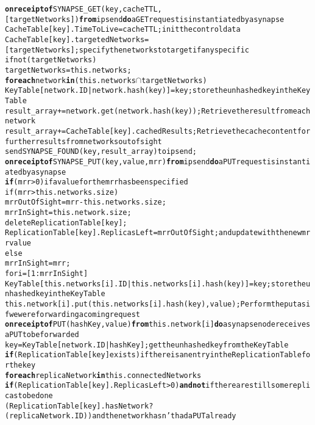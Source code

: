 \begin{figure*}[!t]
{\scriptsize
\begin{alltt}
\AL\textbf{on receipt of} SYNAPSE_GET(key, cacheTTL, [targetNetworks]) \textbf{from} ipsend \textbf{do}\hfill{\rm a GET request is instantiated by a synapse}
\AL CacheTable[key].TimeToLive = cacheTTL; \hfill{\rm init the control data}
\AL CacheTable[key].targetedNetworks = [targetNetworks]; \hfill{\rm specify the networks to target if any specific}  
\AL if not (targetNetworks) \hfill{}
\AL  targetNetworks = this.networks; \hfill{}
\AL \textbf{for each} network \textbf{in} (this.networks \(\cap\) targetNetworks) \hfill{}
\AL  KeyTable[network.ID|network.hash(key)] = key; \hfill{\rm store the unhashed key in the KeyTable}  
\AL  result_array += network.get(network.hash(key)); \hfill{\rm Retrieve the result from each network}
\AL result_array += CacheTable[key].cachedResults; \hfill{\rm Retrieve the cache content for further results from networks out of sight}
\AL send SYNAPSE_FOUND(key, result_array) to ipsend;
\NA
\AL\textbf{on receipt of} SYNAPSE_PUT(key, value, mrr) \textbf{from} ipsend \textbf{do}\hfill{\rm a PUT request is instantiated by a synapse}
\AL \textbf{if} (mrr > 0)  \hfill{\rm if a value for the mrr has been specified}
\AL  if (mrr > this.networks.size)
\AL   mrrOutOfSight = mrr - this.networks.size;
\AL   mrrInSight = this.network.size;
\AL   delete ReplicationTable[key];
\AL   ReplicationTable[key].ReplicasLeft = mrrOutOfSight; \hfill{\rm and update with the new mrr value}
\AL  else
\AL   mrrInSight = mrr;
\AL  for i = [1:mrrInSight]
\AL   KeyTable[this.networks[i].ID|this.networks[i].hash(key)] = key; \hfill{\rm store the unhashed key in the KeyTable}
\AL   this.network[i].put(this.networks[i].hash(key), value);\hfill{\rm Perform the put as if we were forwarding a coming request}
\NA
\AL\textbf{on receipt of} PUT(hashKey, value) \textbf{from} this.network[i] \textbf{do}\hfill{\rm a synapse node receives a PUT to be forwarded}
\AL key = KeyTable[network.ID|hashKey]; \hfill{\rm get the unhashed key from the Key Table}
\AL \textbf{if} (ReplicationTable[key] exists) \hfill{\rm if there is an entry in the Replication Table for the key}
\AL  \textbf{for each} replicaNetwork \textbf{in} this.connectedNetworks
\AL   \textbf{if} (ReplicationTable[key].ReplicasLeft > 0) \textbf{and not} \hfill{\rm if there are still some replicas to be done}
\AL     (ReplicationTable[key].hasNetwork?(replicaNetwork.ID)) \hfill{\rm and the network hasn't had a PUT already}

\end{alltt}}
\end{figure*}
